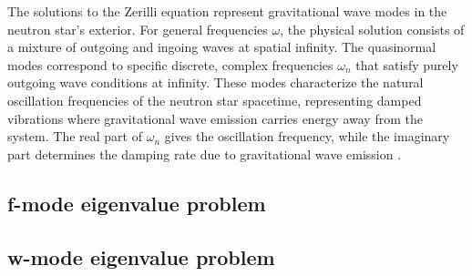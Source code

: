 The solutions to the Zerilli equation represent gravitational wave modes in the neutron star's exterior. For general frequencies \( \omega \), the physical solution consists of a mixture of outgoing and ingoing waves at spatial infinity. The quasinormal modes correspond to specific discrete, complex frequencies \( \omega_n \) that satisfy purely outgoing wave conditions at infinity. These modes characterize the natural oscillation frequencies of the neutron star spacetime, representing damped vibrations where gravitational wave emission carries energy away from the system. The real part of \( \omega_n \) gives the oscillation frequency, while the imaginary part determines the damping rate due to gravitational wave emission \cite{Kokkotas_living_review,Benhar_2004}.




\subsection{f-mode eigenvalue problem}
\subsection{w-mode eigenvalue problem}


